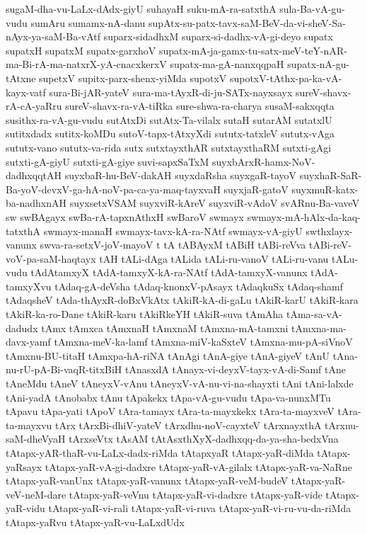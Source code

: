 {sugaM-dha-vu-LaLx-dAdx-giyU
suhayaH
suku-mA-ra-satxthA
sula-Ba-vA-gu-vudu
sumAru
sumamx-nA-danu
supAtx-su-patx-tavx-saM-BeV-da-vi-sheV-Sa-nAyx-ya-saM-Ba-vAtf
suparx-sidadhxM
suparx-si-dadhx-vA-gi-deyo
supatx
supatxH
supatxM
supatx-garxhoV
supatx-mA-ja-gamx-tu-satx-meV-teY-nAR-ma-Bi-rA-ma-natxrX-yA-cnacxkerxV
supatx-ma-gA-nanxqqpaH
supatx-nA-gu-tAtxne
supetxV
supitx-parx-shenx-yiMda
supotxV
supotxV-tAthx-pa-ka-vA-kayx-vatf
sura-Bi-jAR-yateV
sura-ma-tAyxR-di-ju-SATx-nayxsayx
sureV-shavx-rA-cA-yaRru
sureV-shavx-ra-vA-tiRka
sure-shwa-ra-charya
susaM-sakxqqta
susithx-ra-vA-gu-vudu
sutAtxDi
sutAtx-Ta-vilalx
sutaH
sutarAM
sutatxlU
sutitxdadx
sutitx-koMDu
sutoV-tapx-tAtxyXdi
sututx-tatxleV
sututx-vAga
sututx-vano
sututx-va-rida
sutx
sutxtayxthAR
sutxtayxthaRM
sutxti-gAgi
sutxti-gA-giyU
sutxti-gA-giye
suvi-sapxSaTxM
suyxbArxR-hamx-NoV-dadhxqqtAH
suyxbaR-hu-BeV-dakAH
suyxdaRsha
suyxgaR-tayoV
suyxhaR-SaR-Ba-yoV-devxV-ga-hA-noV-pa-ca-ya-maq-tayxvaH
suyxjaR-gatoV
suyxmuR-katx-ba-nadhxnAH
suyxsetxVSAM
suyxviR-kAreV
suyxviR-vAdoV
svARnu-Ba-vaveV
sw
swBAgayx
swBa-rA-tapxnAthxH
swBaroV
swmayx
swmayx-mA-hAlx-da-kaq-tatxthA
swmayx-manaH
swmayx-tavx-kA-ra-NAtf
swmayx-vA-giyU
swthxlayx-vanunx
swva-ra-setxV-joV-mayoV
t
tA
tABAyxM
tABiH
tABi-reVva
tABi-reV-voV-pa-saM-haqtayx
tAH
tALi-dAga
tALida
tALi-ru-vanoV
tALi-ru-vanu
tALu-vudu
tAdAtamxyX
tAdA-tamxyX-kA-ra-NAtf
tAdA-tamxyX-vanunx
tAdA-tamxyXvu
tAdaq-gA-deVsha
tAdaq-knonxV-pAsayx
tAdaqkuSx
tAdaq-shamf
tAdaqsheV
tAda-thAyxR-doBxVkAtx
tAkiR-kA-di-gaLu
tAkiR-karU
tAkiR-kara
tAkiR-ka-ro-Dane
tAkiR-karu
tAkiRkeYH
tAkiR-suva
tAmAha
tAma-sa-vA-dadudx
tAmx
tAmxca
tAmxnaH
tAmxnaM
tAmxna-mA-tamxni
tAmxna-ma-davx-yamf
tAmxna-meV-ka-lamf
tAmxna-miV-kaSxteV
tAmxna-mu-pA-siVnoV
tAmxnu-BU-titaH
tAmxpa-hA-riNA
tAnAgi
tAnA-giye
tAnA-giyeV
tAnU
tAna-nu-rU-pA-Bi-vaqR-titxBiH
tAnasxdA
tAnayx-vi-deyxV-tayx-vA-di-Samf
tAne
tAneMdu
tAneV
tAneyxV-vAnu
tAneyxV-vA-nu-vi-na-shayxti
tAni
tAni-lalxde
tAni-yadA
tAnobabx
tAnu
tApakekx
tApa-vA-gu-vudu
tApa-va-nunxMTu
tApavu
tApa-yati
tApoV
tAra-tamayx
tAra-ta-mayxkekx
tAra-ta-mayxveV
tAra-ta-mayxvu
tArx
tArxBi-dhiV-yateV
tArxdhu-noV-cayxteV
tArxnayxthA
tArxnu-saM-dheVyaH
tArxseVtx
tAsAM
tAtAsxthXyX-dadhxqq-da-ya-sha-bedxVna
tAtapx-yAR-thaR-vu-LaLx-dadx-riMda
tAtapxyaR
tAtapx-yaR-diMda
tAtapx-yaRsayx
tAtapx-yaR-vA-gi-dadxre
tAtapx-yaR-vA-gilalx
tAtapx-yaR-va-NaRne
tAtapx-yaR-vanUnx
tAtapx-yaR-vanunx
tAtapx-yaR-veM-budeV
tAtapx-yaR-veV-neM-dare
tAtapx-yaR-veVnu
tAtapx-yaR-vi-dadxre
tAtapx-yaR-vide
tAtapx-yaR-vidu
tAtapx-yaR-vi-rali
tAtapx-yaR-vi-ruva
tAtapx-yaR-vi-ru-vu-da-riMda
tAtapx-yaRvu
tAtapx-yaR-vu-LaLxdUdx
}
